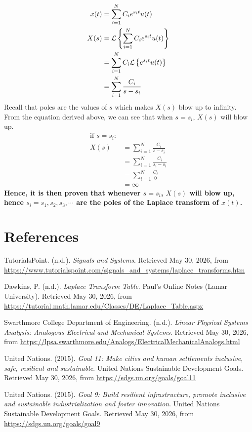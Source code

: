 \begin{align*}
    x(t) &= \sum_{i=1}^{N} C_i e^{s_i t} u(t)\\
    X(s) &= \mathcal{L}\left\{\sum_{i=1}^{N} C_i e^{s_i t} u(t)\right\}\\
    &= \sum_{i=1}^{N} C_i \mathcal{L}\left\{e^{s_i t} u(t)\right\} \\
    &= \sum_{i=1}^{N} \frac{C_i}{s - s_i}
\end{align*}
Recall that poles are the values of $s$ which makes $X(s)$ blow up to infinity. From the equation derived above, we can see that when $s=s_i$, $X(s)$ will blow up.
\begin{align*}
    \text{if } s = s_i:\\
    X(s) &= \sum_{i=1}^{N} \frac{C_i}{s - s_i} \\
    & = \sum_{i=1}^{N} \frac{C_i}{s_i - s_i} \\
    & = \sum_{i=1}^{N} \frac{C_i}{0}\\
    & = \infty
\end{align*}
\textbf{Hence, it is then proven that whenever $s = s_i$, $X(s)$ will blow up, hence $s_i = s_1, s_2, s_3, \cdots$ are the poles of the Laplace transform of $x(t)$.}

\newpage
\section{References}
\begin{enumerate}[label={[\arabic*]}, leftmargin=*, itemsep=6pt]
    \item TutorialsPoint. (n.d.). \textit{Signals and Systems}. Retrieved May 30, 2026, from \url{https://www.tutorialspoint.com/signals_and_systems/laplace_transforms.htm}
    \item Dawkins, P. (n.d.). \textit{Laplace Transform Table}. Paul's Online Notes (Lamar University). Retrieved May 30, 2026, from \url{https://tutorial.math.lamar.edu/Classes/DE/Laplace_Table.aspx}
    \item Swarthmore College Department of Engineering. (n.d.). \textit{Linear Physical Systems Analysis: Analogous Electrical and Mechanical Systems}. Retrieved May 30, 2026, from \url{https://lpsa.swarthmore.edu/Analogs/ElectricalMechanicalAnalogs.html}
    \item United Nations. (2015). \textit{Goal 11: Make cities and human settlements inclusive, safe, resilient and sustainable}. United Nations Sustainable Development Goals. Retrieved May 30, 2026, from \url{https://sdgs.un.org/goals/goal11}
    \item United Nations. (2015). \textit{Goal 9: Build resilient infrastructure, promote inclusive and sustainable industrialization and foster innovation}. United Nations Sustainable Development Goals. Retrieved May 30, 2026, from \url{https://sdgs.un.org/goals/goal9}
\end{enumerate}